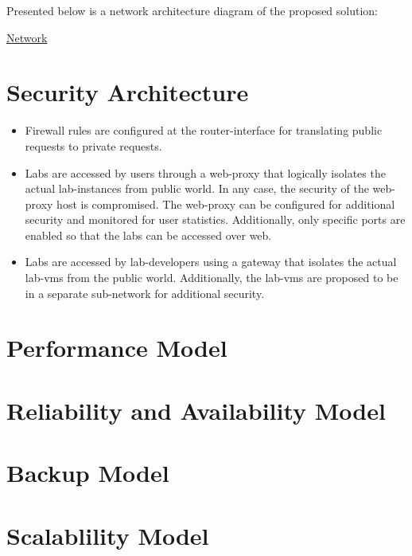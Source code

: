 \documentclass[11pt]{article}
\begin{document}
  Presented below is a network architecture diagram of the proposed
  solution:

   \href{file://../network-infrastructure.jpg }{Network}

\section{Security Architecture}
\label{sec-6}


\begin{itemize}
\item Firewall rules are configured at the router-interface for
    translating public requests to private requests.
\item Labs are accessed by users through a web-proxy that logically
    isolates the actual lab-instances from public world. In any case,
    the security of the web-proxy host is compromised. The web-proxy
    can be configured for additional security and monitored for user
    statistics. Additionally, only specific ports are enabled so that
    the labs can be accessed over web.
\item Labs are accessed by lab-developers using a gateway that isolates
    the actual lab-vms from the public world. Additionally, the
    lab-vms are proposed to be in a separate sub-network for
    additional security.
\end{itemize}
\section{Performance Model}
\label{sec-7}

\section{Reliability and Availability Model}
\label{sec-8}

\section{Backup Model}
\label{sec-9}

\section{Scalablility Model}
\label{sec-10}
\end{document}
